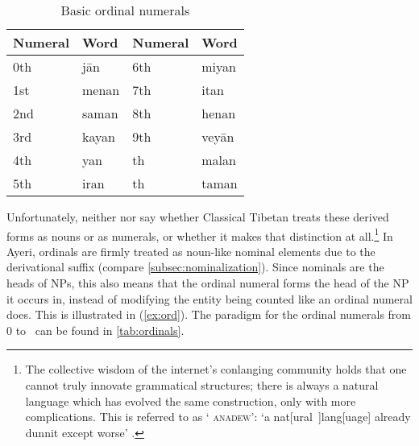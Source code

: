 \begin{table}\centering
\caption{Basic ordinal numerals}
\begin{tabu} to .75\linewidth {X[c] I X[c] I}
\toprule\tableheaderfont
Numeral
	& Word
	& Numeral
	& Word
	\\
\toprule

0th
	& jān %
	& 6th
	& miyan %
	\\

1st
	& menan %
	& 7th
	& itan %
	\\
	
2nd
	& saman %
	& 8th
	& henan %
	\\
	
3rd
	& kayan %
	& 9th
	& veyān %
	\\

4th
	& yan %
	& \ten{}th
	& malan %
	\\

5th
	& iran %
	& \elv{}th
	& taman %
	\\

\bottomrule
\end{tabu}
\label{tab:ordinals}
\end{table}

Unfortunately, neither \citet{chungetal2014} nor \citet{beyer1992} say whether
Classical Tibetan treats these derived forms as nouns or as numerals, or
whether it makes that distinction at all.\footnote{The collective wisdom of the
internet's conlanging community holds that one cannot truly innovate
grammatical structures; there is always a natural language which has evolved
the same construction, only with more complications. This is referred to as `
\textsc{anadew}': `a nat[ural~]lang[uage] already dunnit except worse'
\citep{teoh2003}.} In Ayeri, ordinals are firmly treated as noun-like nominal
elements due to the derivational suffix  (compare
\autoref{subsec:nominalization}). Since nominals are the heads of NPs, this
also means that the ordinal numeral forms the head of the NP it occurs in,
instead of modifying the entity being counted like an ordinal numeral does.
This is illustrated in (\ref{ex:ord}). The paradigm for the ordinal numerals
from 0 to \elv\ can be found in
\autoref{tab:ordinals}.

